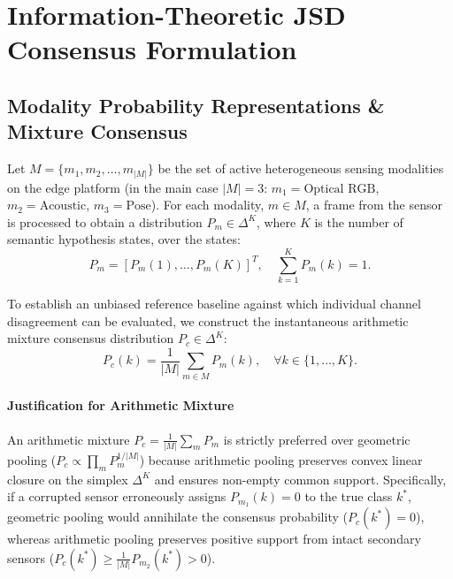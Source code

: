 \documentclass[conference]{IEEEtran}
\begin{document}
\section{Information-Theoretic JSD Consensus Formulation}
\subsection{Modality Probability Representations \& Mixture Consensus}
Let $M = \{m_1, m_2, \dots, m_{|M|}\}$ be the set of active heterogeneous sensing modalities on the edge platform (in the main case $|M| = 3$: $m_1 = \text{Optical RGB}$, $m_2 = \text{Acoustic}$, $m_3 = \text{Pose}$). For each modality, $m \in M$, a frame from the sensor is processed to obtain a distribution $P_m \in \Delta^K$, where $K$ is the number of semantic hypothesis states, over the states:
\begin{equation}
P_m = [P_m(1), \dots, P_m(K)]^T, \quad \sum_{k=1}^K P_m(k) = 1.
\end{equation}

To establish an unbiased reference baseline against which individual channel disagreement can be evaluated, we construct the instantaneous arithmetic mixture consensus distribution $P_c \in \Delta^K$:
\begin{equation}
P_c(k) = \frac{1}{|M|} \sum_{m \in M} P_m(k), \quad \forall k \in \{1, \dots, K\}.
\end{equation}

\paragraph{Justification for Arithmetic Mixture} An arithmetic mixture $P_c = \frac{1}{|M|} \sum_m P_m$ is strictly preferred over geometric pooling ($P_c \propto \prod_m P_m^{1/|M|}$) because arithmetic pooling preserves convex linear closure on the simplex $\Delta^K$ and ensures non-empty common support. Specifically, if a corrupted sensor erroneously assigns $P_{m_1}(k) = 0$ to the true class $k^*$, geometric pooling would annihilate the consensus probability ($P_c(k^*) = 0$), whereas arithmetic pooling preserves positive support from intact secondary sensors ($P_c(k^*) \ge \frac{1}{|M|} P_{m_2}(k^*) > 0$).
\end{document}
